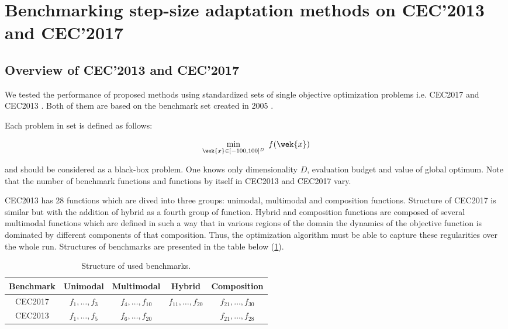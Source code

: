 \section{Benchmarking step-size adaptation methods on CEC'2013 and CEC'2017}
\subsection{Overview of CEC'2013 and CEC'2017}

We tested the performance of proposed methods using standardized sets of single objective optimization problems i.e. CEC2017 \cite{cec2017} and CEC2013 \cite{2013}. Both of them are based on the benchmark set created in 2005 \cite{cec2005}.

Each problem in set is defined as follows:

\begin{equation*}
  \min_{\wek{x} \in [-100, 100]^{D}}\; f(\wek{x})
\end{equation*}

and should be considered as a black-box problem. One knows only dimensionality $D$, evaluation budget and value of global optimum. Note that the number of benchmark functions and functions by itself in CEC2013 and CEC2017 vary. 

CEC2013 has 28 functions which are dived into three groups: unimodal, multimodal and composition functions.
Structure of CEC2017 is similar but with the addition of hybrid as a fourth group of function. 
Hybrid and composition functions are composed of several multimodal functions which are defined in such a way that in various regions of the
domain the dynamics of the objective function is dominated by different components of that composition.
Thus, the optimization algorithm must be able to capture these regularities over the whole run.
Structures of benchmarks are presented in the table below (\ref{cec-table}).

\begin{table}[H]
\label{cec-table}
\centering
\begin{tabular}{|c|c|c|l|l|l|c|c|}
\hline
Benchmark & Unimodal          & \multicolumn{4}{c|}{Multimodal}             & Hybrid                  & Composition             \\ \hline
CEC2017     & $f_1, \dots, f_3$ & \multicolumn{4}{c|}{$f_4, \dots, f_{10}$}   & $f_{11}, \dots, f_{20}$ & $f_{21}, \dots, f_{30}$ \\ \hline
CEC2013     & $f_1, \dots, f_5$ & \multicolumn{4}{c|}{$f_{6}, \dots, f_{20}$} &                         & $f_{21}, \dots, f_{28}$ \\ \hline
\end{tabular}
\caption{Structure of used benchmarks.}
\end{table}

